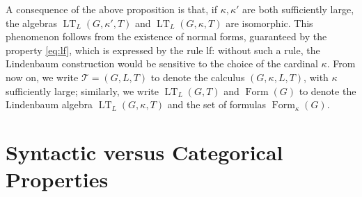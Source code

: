 \documentclass{article}
\theoremstyle{definition}
\DeclareMathOperator{\LT}{LT}
\DeclareMathOperator{\Formulas}{Form}
\begin{document}

A consequence of the above proposition is that, if 
$\kappa, \kappa'$ are both sufficiently large,
the algebras 
$\LT_L(G,\kappa',T)$ and $\LT_L(G,\kappa,T)$ are isomorphic. This phenomenon follows from the existence of normal forms, guaranteed by the property \cref{eq:lf}, which is expressed by the rule lf: without such a rule, the Lindenbaum construction would be sensitive to the choice of the cardinal $\kappa$. From now on, we write $\mathcal{T} = (G,L,T)$ to denote the calculus $(G,\kappa, L,T)$, with $\kappa$ sufficiently large;
similarly, we write $\LT_L(G,T)$ and $\Formulas(G)$ to denote the Lindenbaum algebra $\LT_L(G,\kappa,T)$ and the set of formulas $\Formulas_\kappa(G)$.
\section{Syntactic versus Categorical Properties}\label{sec:prop}
\end{document}
